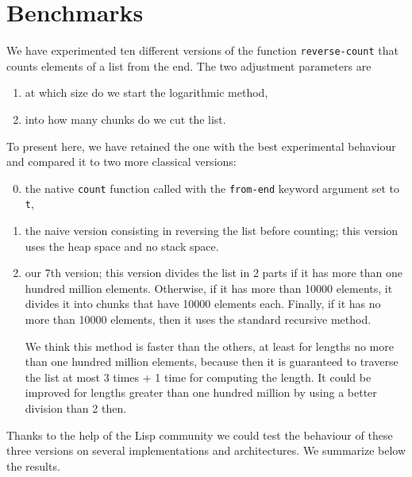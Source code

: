 \section{Benchmarks}
We have experimented ten different versions of the function \texttt{reverse-count}
that counts elements of a list from the end. The two adjustment parameters are
\begin{enumerate}
\item at which size do we start the logarithmic method,
\item into how many chunks do we cut the list.
\end{enumerate}

To present here, we have retained the one with the best experimental behaviour
and compared it to two more classical versions:
\begin{enumerate}
\setcounter{enumi}{-1}
\item the native \texttt{count} function called with the \texttt{from-end} keyword argument set to \texttt{t},
\item the naive version consisting in reversing the list before counting;
this version uses the heap space and no stack space.
\setcounter{enumi}{6}
\item our 7th version;
this version divides the list in 2 parts if it has more than one
hundred million elements.  Otherwise, if it has more than 10000
elements, it divides it into chunks that have 10000 elements each.
Finally, if it has no more than 10000 elements, then it uses the
standard recursive method.

We think this method is faster than the others, at least for
lengths no more than one hundred million elements, because then it
is guaranteed to traverse the list at most 3 times + 1 time for
computing the length.  It could be improved for lengths greater
than one hundred million by using a better division than 2 then.
\end{enumerate}

Thanks to the help of the Lisp community we could test the behaviour
of these three versions on several implementations and architectures.
We summarize below the results.
 
